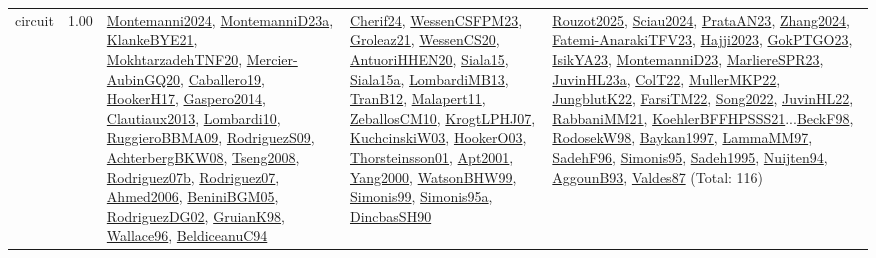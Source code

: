 {\begin{longtable}{p{3cm}r>{\raggedright\arraybackslash}p{6cm}>{\raggedright\arraybackslash}p{6cm}>{\raggedright\arraybackslash}p{8cm}}
\index{circuit}\index{Constraints!circuit}circuit &  1.00 & \hyperref[detail:Montemanni2024]{Montemanni2024}, \hyperref[detail:MontemanniD23a]{MontemanniD23a}, \hyperref[detail:KlankeBYE21]{KlankeBYE21}, \hyperref[detail:MokhtarzadehTNF20]{MokhtarzadehTNF20}, \hyperref[detail:Mercier-AubinGQ20]{Mercier-AubinGQ20}, \hyperref[detail:Caballero19]{Caballero19}, \hyperref[detail:HookerH17]{HookerH17}, \hyperref[detail:Gaspero2014]{Gaspero2014}, \hyperref[detail:Clautiaux2013]{Clautiaux2013}, \hyperref[detail:Lombardi10]{Lombardi10}, \hyperref[detail:RuggieroBBMA09]{RuggieroBBMA09}, \hyperref[detail:RodriguezS09]{RodriguezS09}, \hyperref[detail:AchterbergBKW08]{AchterbergBKW08}, \hyperref[detail:Tseng2008]{Tseng2008}, \hyperref[detail:Rodriguez07b]{Rodriguez07b}, \hyperref[detail:Rodriguez07]{Rodriguez07}, \hyperref[detail:Ahmed2006]{Ahmed2006}, \hyperref[detail:BeniniBGM05]{BeniniBGM05}, \hyperref[detail:RodriguezDG02]{RodriguezDG02}, \hyperref[detail:GruianK98]{GruianK98}, \hyperref[detail:Wallace96]{Wallace96}, \hyperref[detail:BeldiceanuC94]{BeldiceanuC94} & \hyperref[detail:Cherif24]{Cherif24}, \hyperref[detail:WessenCSFPM23]{WessenCSFPM23}, \hyperref[detail:Groleaz21]{Groleaz21}, \hyperref[detail:WessenCS20]{WessenCS20}, \hyperref[detail:AntuoriHHEN20]{AntuoriHHEN20}, \hyperref[detail:Siala15]{Siala15}, \hyperref[detail:Siala15a]{Siala15a}, \hyperref[detail:LombardiMB13]{LombardiMB13}, \hyperref[detail:TranB12]{TranB12}, \hyperref[detail:Malapert11]{Malapert11}, \hyperref[detail:ZeballosCM10]{ZeballosCM10}, \hyperref[detail:KrogtLPHJ07]{KrogtLPHJ07}, \hyperref[detail:KuchcinskiW03]{KuchcinskiW03}, \hyperref[detail:HookerO03]{HookerO03}, \hyperref[detail:Thorsteinsson01]{Thorsteinsson01}, \hyperref[detail:Apt2001]{Apt2001}, \hyperref[detail:Yang2000]{Yang2000}, \hyperref[detail:WatsonBHW99]{WatsonBHW99}, \hyperref[detail:Simonis99]{Simonis99}, \hyperref[detail:Simonis95a]{Simonis95a}, \hyperref[detail:DincbasSH90]{DincbasSH90} & \hyperref[detail:Rouzot2025]{Rouzot2025}, \hyperref[detail:Sciau2024]{Sciau2024}, \hyperref[detail:PrataAN23]{PrataAN23}, \hyperref[detail:Zhang2024]{Zhang2024}, \hyperref[detail:Fatemi-AnarakiTFV23]{Fatemi-AnarakiTFV23}, \hyperref[detail:Hajji2023]{Hajji2023}, \hyperref[detail:GokPTGO23]{GokPTGO23}, \hyperref[detail:IsikYA23]{IsikYA23}, \hyperref[detail:MontemanniD23]{MontemanniD23}, \hyperref[detail:MarliereSPR23]{MarliereSPR23}, \hyperref[detail:JuvinHL23a]{JuvinHL23a}, \hyperref[detail:ColT22]{ColT22}, \hyperref[detail:MullerMKP22]{MullerMKP22}, \hyperref[detail:JungblutK22]{JungblutK22}, \hyperref[detail:FarsiTM22]{FarsiTM22}, \hyperref[detail:Song2022]{Song2022}, \hyperref[detail:JuvinHL22]{JuvinHL22}, \hyperref[detail:RabbaniMM21]{RabbaniMM21}, \hyperref[detail:KoehlerBFFHPSSS21]{KoehlerBFFHPSSS21}...\hyperref[detail:BeckF98]{BeckF98}, \hyperref[detail:RodosekW98]{RodosekW98}, \hyperref[detail:Baykan1997]{Baykan1997}, \hyperref[detail:LammaMM97]{LammaMM97}, \hyperref[detail:SadehF96]{SadehF96}, \hyperref[detail:Simonis95]{Simonis95}, \hyperref[detail:Sadeh1995]{Sadeh1995}, \hyperref[detail:Nuijten94]{Nuijten94}, \hyperref[detail:AggounB93]{AggounB93}, \hyperref[detail:Valdes87]{Valdes87} (Total: 116)\\

\end{longtable}}
